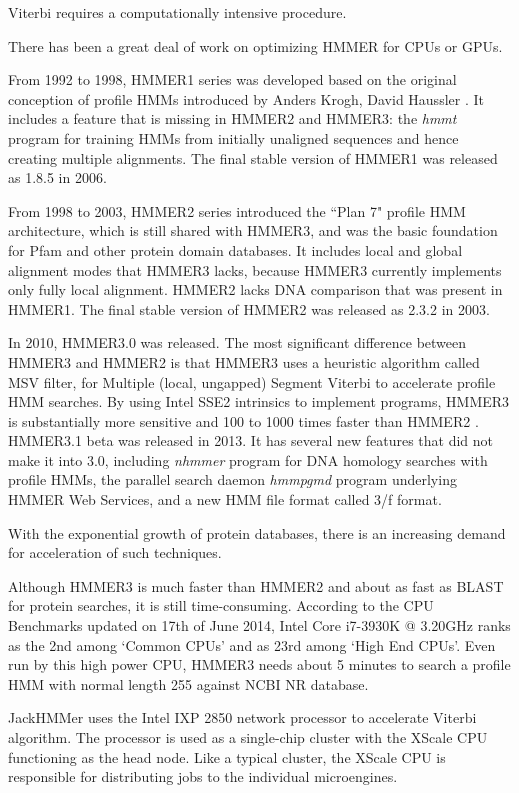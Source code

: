 Viterbi requires a computationally intensive procedure.

There has been a great deal of work on optimizing HMMER for CPUs or GPUs. 

From 1992 to 1998, HMMER1 series was developed based on the original conception of profile HMMs introduced by Anders Krogh, David Haussler \citep{Krogh}. It includes a feature that is missing in HMMER2 and HMMER3: the \emph{hmmt} program for training HMMs from initially unaligned sequences and hence creating multiple alignments. The final stable version of HMMER1 was released as 1.8.5 in 2006. 

From 1998 to 2003, HMMER2 series introduced the ``Plan 7" profile HMM architecture, which is still shared with HMMER3, and was the basic foundation for Pfam and other protein domain databases. It includes local and global alignment modes that HMMER3 lacks, because HMMER3 currently implements only fully local alignment. HMMER2 lacks DNA comparison that was present in HMMER1. The final stable version of HMMER2 was released as 2.3.2 in 2003.

In 2010, HMMER3.0 was released. The most significant difference between HMMER3 and HMMER2 is that HMMER3 uses a heuristic algorithm called MSV filter, for Multiple (local, ungapped) Segment Viterbi to accelerate profile HMM searches. By using Intel SSE2 intrinsics to implement programs, HMMER3 is substantially more sensitive and 100 to 1000 times faster than HMMER2 \citep{HMMER3}. HMMER3.1 beta was released in 2013. It has several new features that did not make it into 3.0, including \emph{nhmmer} program for DNA homology searches with profile HMMs, the parallel search daemon \emph{hmmpgmd} program underlying HMMER Web Services, and a new HMM file format called 3/f format.

With the exponential growth of protein databases, there is an increasing demand for acceleration of such techniques.

Although HMMER3 is much faster than HMMER2 and about as fast as BLAST for protein searches, it is still time-consuming. According to the CPU Benchmarks \citep{cpus} updated on 17th of June 2014, Intel Core i7-3930K @ 3.20GHz ranks as the 2nd among `Common CPUs' and as 23rd among `High End CPUs'. Even run by this high power CPU, HMMER3 needs about 5 minutes to search a profile HMM with normal length 255 against NCBI NR database.

JackHMMer \citep{Wun} uses the Intel IXP 2850 network processor to accelerate Viterbi algorithm. The processor is used as a single-chip cluster with the XScale CPU functioning as the head node. Like a typical cluster, the XScale CPU is responsible for distributing jobs to the individual microengines. 

